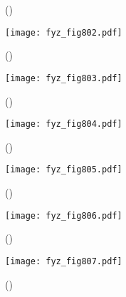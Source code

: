     \begin{figure}[ht!]
      \centering
                     \newline
                     \newline
      \caption{
               (\cite[s.~748]{Feynman02})}
      \label{fyz:fig801}
    \end{figure}

    \begin{figure}[ht!] %
      \centering
      \texttt{[image: fyz\_fig802.pdf]}
      \caption{
               (\cite[s.~707]{Feynman02})}
      \label{fyz:fig802}
    \end{figure}
    
    \begin{figure}[ht!] %
      \centering
      \texttt{[image: fyz\_fig803.pdf]}
      \caption{
               (\cite[s.~707]{Feynman02})}
      \label{fyz:fig803}
    \end{figure}

    \begin{figure}[ht!] %
      \centering
      \texttt{[image: fyz\_fig804.pdf]}
      \caption{
               (\cite[s.~707]{Feynman02})}
      \label{fyz:fig804}
    \end{figure}
    
    \begin{figure}[ht!] %
      \centering
      \texttt{[image: fyz\_fig805.pdf]}
      \caption{
               (\cite[s.~707]{Feynman02})}
      \label{fyz:fig805}
    \end{figure}


    \begin{figure}[ht!] %
      \centering
      \texttt{[image: fyz\_fig806.pdf]}
      \caption{
               (\cite[s.~707]{Feynman02})}
      \label{fyz:fig806}
    \end{figure}

    \begin{figure}[ht!] %
      \centering
      \texttt{[image: fyz\_fig807.pdf]}
      \caption{
               (\cite[s.~707]{Feynman02})}
      \label{fyz:fig807}
    \end{figure}
    
